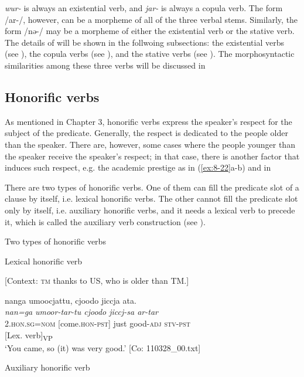 \textit{wur-} is always an existential verb, and \textit{jar-} is always a copula verb. The form /ar-/, however, can be a morpheme of all of the three verbal stems. Similarly, the form /nə-/ may be a morpheme of either the existential verb or the stative verb. The details of  will be shown in the follwoing subsections: the existential verbs (see ), the copula verbs (see ), and the stative verbs (see ). The morphosyntactic similarities among these three verbs will be discussed in 

\subsection{Honorific verbs}

As mentioned in Chapter 3, honorific verbs express the speaker’s respect for the subject of the predicate. Generally, the respect is dedicated to the people older than the speaker. There are, however, some cases where the people younger than the speaker receive the speaker’s respect; in that case, there is another factor that induces such respect, e.g. the academic prestige as in (\ref{ex:8-22}a-b) and  in 

There are two types of honorific verbs. One of them can fill the predicate slot of a clause by itself, i.e. lexical honorific verbs. The other cannot fill the predicate slot only by itself, i.e. auxiliary honorific verbs, and it needs a lexical verb to precede it, which is called the auxiliary verb construction (see ).

\ea\label{ex:8-21}
  Two types of honorific verbs

\ea Lexical honorific verb

    [Context: \textsc{tm} thanks to US, who is older than TM.]

{\TM}
\gllll  nanga  umoocjattu,  {\textbar}cjoodo{\textbar}  jiccja  ata.\\
\textit{nan=ga}  \textit{umoor-tar-tu  cjoodo  jiccj-sa  ar-tar}\\
2.\textsc{hon}.\textsc{sg}=\textsc{nom}  [come.\textsc{hon}-\textsc{pst}]  just  good-\textsc{adj}  \textsc{stv}-\textsc{pst}\\
        {}[Lex. verb]\textsubscript{VP}      \\
\glt ‘You came, so (it) was very good.’ [Co: 110328\_00.txt]

\ex Auxiliary honorific verb

